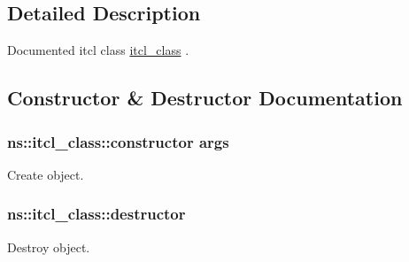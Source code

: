 \subsection{Detailed Description}
Documented itcl class {\ttfamily \hyperlink{classns_1_1itcl__class}{itcl\-\_\-class}} . 

\subsection{Constructor \& Destructor Documentation}
\hypertarget{classns_1_1itcl__class_a8ba2ba9d7bcb63b99a765e8f6003134b}{
\subsubsection[{constructor}]{\setlength{\rightskip}{0pt plus 5cm}ns\-::itcl\-\_\-class\-::constructor {args }
}}\label{classns_1_1itcl__class_a8ba2ba9d7bcb63b99a765e8f6003134b}
Create object. \hypertarget{classns_1_1itcl__class_ac72f3174993656391f9b54487aa4795e}{
\subsubsection[{destructor}]{\setlength{\rightskip}{0pt plus 5cm}ns\-::itcl\-\_\-class\-::destructor {}
}}\label{classns_1_1itcl__class_ac72f3174993656391f9b54487aa4795e}
Destroy object. 

